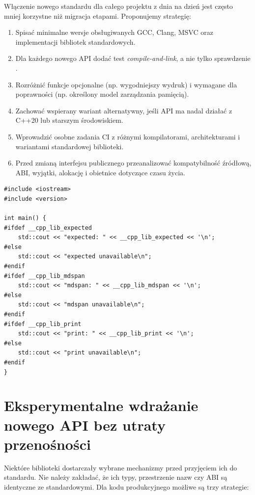 Włączenie nowego standardu dla całego projektu z dnia na dzień jest
często mniej korzystne niż migracja etapami. Proponujemy strategię:

\begin{enumerate}
\item Spisać minimalne wersje obsługiwanych GCC, Clang, MSVC oraz
      implementacji bibliotek standardowych.
\item Dla każdego nowego API dodać test \emph{compile-and-link},
      a nie tylko sprawdzenie .
\item Rozróżnić funkcje opcjonalne (np. wygodniejszy wydruk) i wymagane
      dla poprawności (np. określony model zarządzania pamięcią).
\item Zachować wspierany wariant alternatywny, jeśli API ma nadal działać
      z C++20 lub starszym środowiskiem.
\item Wprowadzić osobne zadania CI z różnymi kompilatorami,
      architekturami i wariantami standardowej biblioteki.
\item Przed zmianą interfejsu publicznego przeanalizować kompatybilność
      źródłową, ABI, wyjątki, alokację i obietnice dotyczące czasu życia.
\end{enumerate}

\begin{lstlisting}[caption={Weryfikacja obecnosci nowych funkcji biblioteki (C++23).}]
#include <iostream>
#include <version>

int main() {
#ifdef __cpp_lib_expected
    std::cout << "expected: " << __cpp_lib_expected << '\n';
#else
    std::cout << "expected unavailable\n";
#endif
#ifdef __cpp_lib_mdspan
    std::cout << "mdspan: " << __cpp_lib_mdspan << '\n';
#else
    std::cout << "mdspan unavailable\n";
#endif
#ifdef __cpp_lib_print
    std::cout << "print: " << __cpp_lib_print << '\n';
#else
    std::cout << "print unavailable\n";
#endif
}
\end{lstlisting}

\section{Eksperymentalne wdrażanie nowego API bez utraty przenośności}

Niektóre biblioteki  dostarczały wybrane
mechanizmy przed przyjęciem ich do standardu. Nie należy zakładać,
że ich typy, przestrzenie nazw czy ABI są identyczne ze standardowymi.
Dla kodu produkcyjnego możliwe są trzy strategie:

